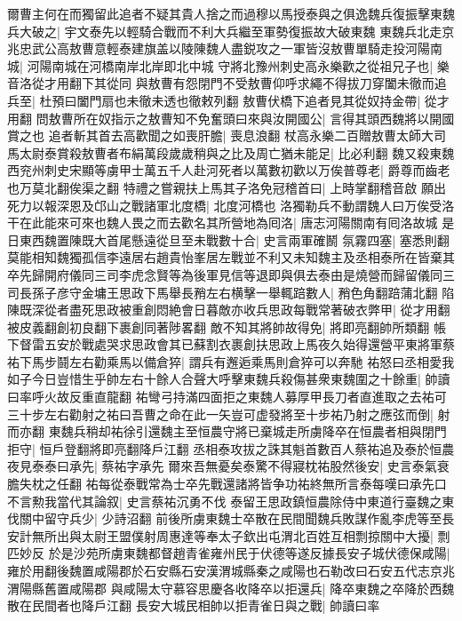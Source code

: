 爾曹主何在而獨留此追者不疑其貴人捨之而過穆以馬授泰與之俱逸魏兵復振擊東魏兵大破之|{
	宇文泰先以輕騎合戰而不利大兵繼至軍勢復振故大破東魏}
東魏兵北走京兆忠武公高敖曹意輕泰建旗盖以陵陳魏人盡鋭攻之一軍皆沒敖曹單騎走投河陽南城|{
	河陽南城在河橋南岸北岸即北中城}
守將北豫州刺史高永樂歡之從祖兄子也|{
	樂音洛從才用翻下其從同}
與敖曹有怨閉門不受敖曹仰呼求繩不得拔刀穿闔未徹而追兵至|{
	杜預曰闔門扇也未徹未透也徹敕列翻}
敖曹伏橋下追者見其從奴持金帶|{
	從才用翻}
問敖曹所在奴指示之敖曹知不免奮頭曰來與汝開國公|{
	言得其頭西魏將以開國賞之也}
追者斬其首去高歡聞之如喪肝膽|{
	喪息浪翻}
杖高永樂二百贈敖曹太師大司馬太尉泰賞殺敖曹者布絹萬段歲歲稍與之比及周亡猶未能足|{
	比必利翻}
魏又殺東魏西兖州刺史宋顯等虜甲士萬五千人赴河死者以萬數初歡以万俟普尊老|{
	爵尊而齒老也万莫北翻俟渠之翻}
特禮之嘗親扶上馬其子洛免冠稽首曰|{
	上時掌翻稽音啟}
願出死力以報深恩及邙山之戰諸軍北度橋|{
	北度河橋也}
洛獨勒兵不動謂魏人曰万俟受洛干在此能來可來也魏人畏之而去歡名其所營地為囘洛|{
	唐志河陽關南有囘洛故城}
是日東西魏置陳既大首尾懸遠從旦至未戰數十合|{
	史言兩軍確鬭}
氛霧四塞|{
	塞悉則翻}
莫能相知魏獨孤信李遠居右趙貴怡峯居左戰並不利又未知魏主及丞相泰所在皆棄其卒先歸開府儀同三司李虎念賢等為後軍見信等退即與俱去泰由是燒營而歸留儀同三司長孫子彦守金墉王思政下馬舉長矟左右横擊一舉輒踣數人|{
	矟色角翻踣蒲北翻}
陷陳既深從者盡死思政被重創悶絶會日暮敵亦收兵思政每戰常著破衣弊甲|{
	從才用翻被皮義翻創初良翻下裹創同著陟畧翻}
敵不知其將帥故得免|{
	將即亮翻帥所類翻}
帳下督雷五安於戰處哭求思政會其已蘇割衣裹創扶思政上馬夜久始得還營平東將軍蔡祐下馬步鬪左右勸乘馬以備倉猝|{
	謂兵有邂逅乘馬則倉猝可以奔馳}
祐怒曰丞相愛我如子今日豈惜生乎帥左右十餘人合聲大呼擊東魏兵殺傷甚衆東魏圍之十餘重|{
	帥讀曰率呼火故反重直龍翻}
祐彎弓持滿四面拒之東魏人募厚甲長刀者直進取之去祐可三十步左右勸射之祐曰吾曹之命在此一矢豈可虚發將至十步祐乃射之應弦而倒|{
	射而亦翻}
東魏兵稍却祐徐引還魏主至恒農守將已棄城走所虜降卒在恒農者相與閉門拒守|{
	恒戶登翻將即亮翻降戶江翻}
丞相泰攻拔之誅其魁首數百人蔡祐追及泰於恒農夜見泰泰曰承先|{
	蔡祐字承先}
爾來吾無憂矣泰驚不得寢枕祐股然後安|{
	史言泰氣衰膽失枕之任翻}
祐每從泰戰常為士卒先戰還諸將皆争功祐終無所言泰每嘆曰承先口不言勲我當代其論叙|{
	史言蔡祐沉勇不伐}
泰留王思政鎮恒農除侍中東道行臺魏之東伐關中留守兵少|{
	少詩沼翻}
前後所虜東魏士卒散在民間聞魏兵敗謀作亂李虎等至長安計無所出與太尉王盟僕射周惠達等奉太子欽出屯渭北百姓互相剽掠關中大擾|{
	剽匹妙反}
於是沙苑所虜東魏都督趙青雀雍州民于伏德等遂反據長安子城伏德保咸陽|{
	雍於用翻後魏置咸陽郡於石安縣石安漢渭城縣秦之咸陽也石勒改曰石安五代志京兆渭陽縣舊置咸陽郡}
與咸陽太守慕容思慶各收降卒以拒還兵|{
	降卒東魏之卒降於西魏散在民間者也降戶江翻}
長安大城民相帥以拒青雀日與之戰|{
	帥讀曰率}
